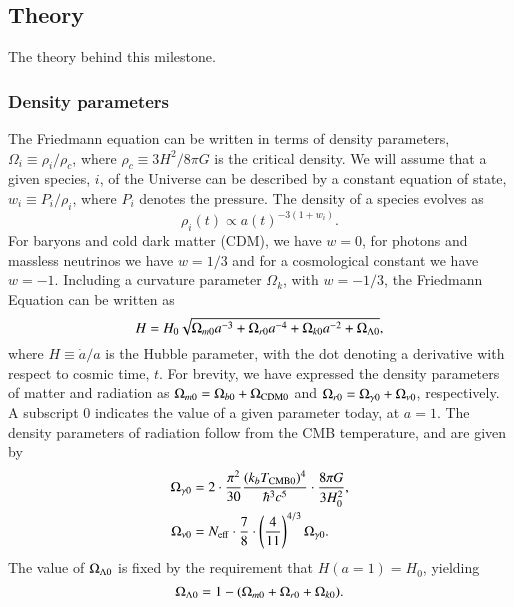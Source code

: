 

\subsection{Theory}\label{M1:theory}
The theory behind this milestone. 



\subsubsection{Density parameters}

The Friedmann equation can be written in terms of density parameters, $\Omega_i\equiv \rho_i/\rho_c$, where $\rho_c\equiv 3H^2/8\pi G$ is the critical density. We will assume that a given species, $i$, of the Universe can be described by a constant equation of state, $w_i \equiv P_i/\rho_i$, where $P_i$ denotes the pressure. The density of a species evolves as \cite[Eq. (2.72)]{Dodelson}
\begin{equation}
    \rho_i(t)\propto a(t)^{-3(1+w_i)}. \label{eq:M1:theory:rho_i_eos_dependence}
\end{equation}
%
%
For baryons and cold dark matter (CDM), we have $w=0$, for photons and massless neutrinos  we have $w=1/3$ and for a cosmological constant we have $w=-1$. Including a curvature parameter $\Omega_k$, with $w=-1/3$, the Friedmann Equation can be written as \cite[Eq. (3.14)]{Dodelson}  
\begin{equation}
    H = H_0 \sqrt{\Omega_{m0} a^{-3} + \Omega_{r0} a^{-4} + \Omega_{k0} a^{-2} + \Omega_{\Lambda 0}}, \label{eq:M1:theory:Friedmann_H_omegas}
\end{equation}
where $H\equiv\dot{a}/a$ is the Hubble parameter, with the dot denoting a derivative with respect to cosmic time, $t$. For brevity, we have expressed the density parameters of matter and radiation as $\Omega_{m0}=\Omega_{b0}+\Omega_\mathrm{CDM0}$ and $\Omega_{r0}=\Omega_{\gamma 0}+\Omega_{\nu 0}$, respectively. A subscript $0$ indicates the value of a given parameter today, at $a=1$. The density parameters of radiation follow from the CMB temperature, and are given by 
\begin{align}
    \Omega_{\gamma 0} &= 2 \cdot \frac{\pi^2}{30} \frac{(k_b T_\mathrm{CMB0})^4}{\hbar^3 c^5} \cdot \frac{8\pi G}{3H_0^2}, \label{eq:M1:theory:omega_gamma0_T} \\
    \Omega_{\nu 0} &= N_\mathrm{eff} \cdot \frac{7}{8} \cdot \left( \frac{4}{11} \right)^{4/3} \Omega_{\gamma 0}. \label{eq:M1:theory:omega_nu0_T}
\end{align}
%
%
The value of $\Omega_{\Lambda 0}$ is fixed by the requirement that $H(a=1)=H_0$, yielding 
\begin{equation}
    \Omega_{\Lambda 0} = 1 - (\Omega_{m0} + \Omega_{r0} + \Omega_{k0}). \label{eq:M1:theory:omega_lambda_0_normalization_condition}
\end{equation}
%

